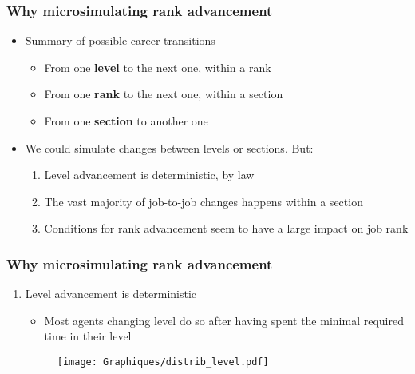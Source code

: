 \documentclass[xcolor=table,ignorenonframetext,12pt]{beamer}
\newcounter{sauvegardeenumi}
\newcommand{\asuivre}{\setcounter{sauvegardeenumi}{\theenumi}}
\begin{document}
\begin{frame}
\frametitle{Why microsimulating rank advancement}
\begin{itemize}
\item Summary of possible career transitions
\begin{itemize}
	\item From one \textbf{level} to the next one, within a rank
	\item From one \textbf{rank} to the next one, within a section
	\item From one \textbf{section} to another one
\end{itemize}
\item We could simulate changes between levels or sections. But:
\begin{enumerate}
	\item Level advancement is deterministic, by law
	\item The vast majority of job-to-job changes happens within a section %
	\item Conditions for rank advancement seem to have a large impact on job rank
\end{enumerate}
\end{itemize}
\end{frame}





\begin{frame}
\frametitle{Why microsimulating rank advancement}
\begin{enumerate}
\item Level advancement is deterministic
\begin{itemize}
\item Most agents changing level do so after having spent the minimal required time in their level
\end{itemize}
\vspace{-0.1cm}
\begin{center}
\begin{figure}
	\texttt{[image: Graphiques/distrib\_level.pdf]}
\end{figure}
\end{center}
\asuivre
\end{enumerate}
\end{frame}
\end{document}
